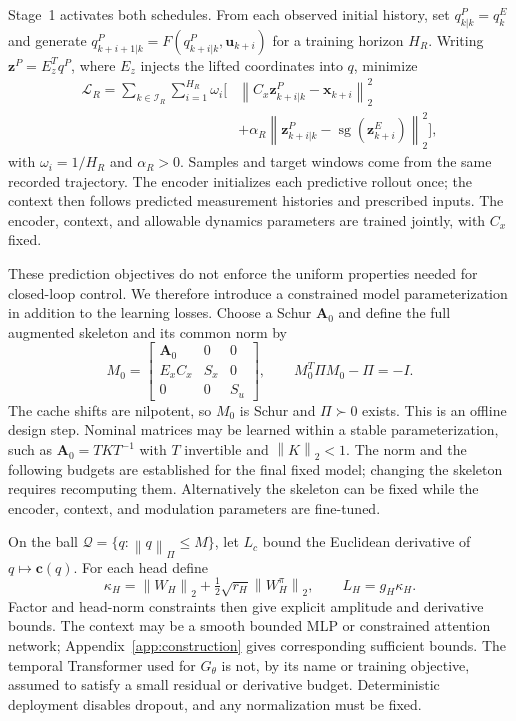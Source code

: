 \documentclass[journal]{IEEEtran}
\newcommand{\vx}{\mathbf{x}}
\newcommand{\vu}{\mathbf{u}}
\newcommand{\vz}{\mathbf{z}}
\newcommand{\vc}{\mathbf{c}}
\newcommand{\mA}{\mathbf{A}}
\newcommand{\norm}[1]{\left\lVert #1\right\rVert}
\begin{document}
Stage~1 activates both schedules. From each observed initial history, set $q_{k|k}^P=q_k^E$ and generate $q_{k+i+1|k}^P=F(q_{k+i|k}^P,\vu_{k+i})$ for a training horizon $H_R$. Writing $\vz^P=E_z^Tq^P$, where $E_z$ injects the lifted coordinates into $q$, minimize
\begin{equation}
\begin{split}
\mathcal L_R=\sum_{k\in\mathcal I_R}\sum_{i=1}^{H_R}\omega_i\bigl[&
\norm{C_x\vz_{k+i|k}^P-\vx_{k+i}}_2^2\\
&+\alpha_R\norm{\vz_{k+i|k}^P-\operatorname{sg}(\vz_{k+i}^E)}_2^2\bigr],
\end{split}
\label{eq:joint_training_loss}
\end{equation}
with $\omega_i=1/H_R$ and $\alpha_R>0$. Samples and target windows come from the same recorded trajectory. The encoder initializes each predictive rollout once; the context then follows predicted measurement histories and prescribed inputs. The encoder, context, and allowable dynamics parameters are trained jointly, with $C_x$ fixed.

These prediction objectives do not enforce the uniform properties needed for closed-loop control. We therefore introduce a constrained model parameterization in addition to the learning losses. Choose a Schur $\mA_0$ and define the full augmented skeleton and its common norm by
\begin{equation}
M_0=\begin{bmatrix}\mA_0&0&0\\E_xC_x&S_x&0\\0&0&S_u\end{bmatrix},\qquad
M_0^T\Pi M_0-\Pi=-I.
\label{eq:lyapunov_skeleton}
\end{equation}
The cache shifts are nilpotent, so $M_0$ is Schur and $\Pi\succ0$ exists. This is an offline design step. Nominal matrices may be learned within a stable parameterization, such as $\mA_0=TKT^{-1}$ with $T$ invertible and $\norm{K}_2<1$. The norm and the following budgets are established for the final fixed model; changing the skeleton requires recomputing them. Alternatively the skeleton can be fixed while the encoder, context, and modulation parameters are fine-tuned.

On the ball $\mathcal Q=\{q:\norm{q}_\Pi\le M\}$, let $L_c$ bound the Euclidean derivative of $q\mapsto\vc(q)$. For each head define
\begin{equation}
\kappa_H=\norm{W_H}_2+\tfrac12\sqrt{r_H}\norm{W_H^\pi}_2,\qquad L_H=g_H\kappa_H.
\label{eq:Lipschitz_constants}
\end{equation}
Factor and head-norm constraints then give explicit amplitude and derivative bounds. The context may be a smooth bounded MLP or constrained attention network; Appendix~\ref{app:construction} gives corresponding sufficient bounds. The temporal Transformer used for $G_\theta$ is not, by its name or training objective, assumed to satisfy a small residual or derivative budget. Deterministic deployment disables dropout, and any normalization must be fixed.
\end{document}
